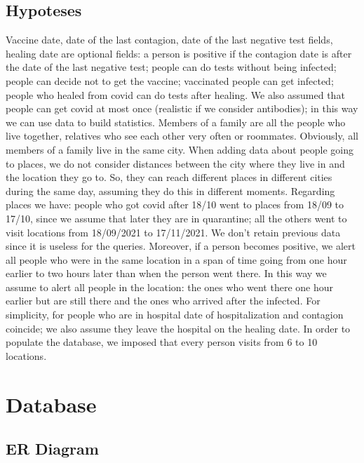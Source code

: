 \documentclass[12pt, a4paper]{article}
\begin{document}
\subsection{Hypoteses}
Vaccine date, date of the last contagion, date of the last negative test fields, healing date are optional fields: a person is positive if the contagion date is after the date of the last negative test; people can do tests without being infected; people can decide not to get the vaccine; vaccinated people can get infected; people who healed from covid can do tests after healing. We also assumed that people can get covid at most once (realistic if we consider antibodies); in this way we can use data to build statistics.
Members of a family are all the people who live together, relatives who see each other very often or roommates. Obviously, all members of a family live in the same city.
When adding data about people going to places, we do not consider distances between the city where they live in and the location they go to. So, they can reach different places in different cities during the same day, assuming they do this in different moments.
Regarding places we have: people who got covid after 18/10 went to places from 18/09 to 17/10, since we assume that later they are in quarantine; all the others went to visit locations from 18/09/2021 to 17/11/2021. We don’t retain previous data since it is useless for the queries. Moreover, if a person becomes positive, we alert all people who were in the same location in a span of time going from one hour earlier to two hours later than when the person went there. In this way we assume to alert all people in the location: the ones who went there one hour earlier but are still there and the ones who arrived after the infected. 
For simplicity, for people who are in hospital date of hospitalization and contagion coincide; we also assume they leave the hospital on the healing date.
In order to populate the database, we imposed that every person visits from 6 to 10 locations.
\clearpage

\section{Database}

\subsection{ER Diagram}

\blindtext
\end{document}
